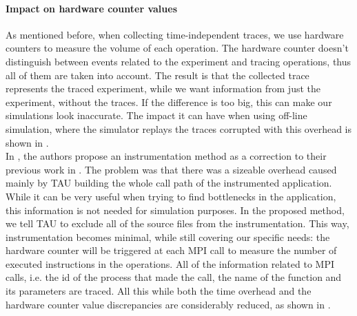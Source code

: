 \paragraph{Impact on hardware counter values}
As mentioned before, when collecting time-independent traces, we use
hardware counters to measure the volume of each operation. The
hardware counter doesn't distinguish between events related to the
experiment and tracing operations, thus all of them are taken into
account. The result is that the collected trace represents the traced
experiment, while we want information from just the experiment,
without the traces. If the difference is too big, this can make our
simulations look inaccurate. The impact it can have when using
off-line simulation, where the simulator replays the traces corrupted
with this overhead is shown in \cite{dms12}.\\[0.3cm]
In \cite{dms12}, the authors propose an instrumentation method as a
correction to their previous work in \cite{dmsq11}. The problem was
that there was a sizeable overhead caused mainly by TAU building the
whole call path of the instrumented application. While it can be
very useful when trying to find bottlenecks in the application, this
information is not needed for simulation purposes. In the proposed
method, we tell TAU to exclude all of the source files from the
instrumentation. This way, instrumentation becomes minimal, while
still covering our specific needs: the hardware counter will be
triggered at each MPI call to measure the number of executed
instructions in the operations. All of the information related to MPI
calls, i.e. the id of the process that made the call, the name of the
function and its parameters are traced. All this while both the time
overhead and the hardware counter value discrepancies are considerably
reduced, as shown in \cite{dms12}.
